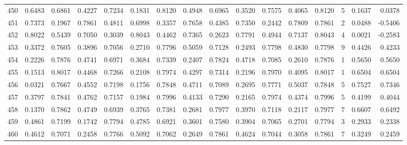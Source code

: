 \begin{tabular}{lrrrrrrrrrrrrrrr}
450 &      0.6483 &  0.6861 &  0.4227 &  0.7234 &  0.1831 &  0.8120 &  0.4948 &  0.6965 &  0.3520 &  0.7575 &   0.4065 &     0.8120 &      5 &                    0.1637 &                     0.0378 \\
451 &      0.7373 &  0.1967 &  0.7861 &  0.4811 &  0.6998 &  0.3357 &  0.7658 &  0.4385 &  0.7350 &  0.2442 &   0.7809 &     0.7861 &      2 &                    0.0488 &                    -0.5406 \\
452 &      0.8022 &  0.5439 &  0.7050 &  0.3039 &  0.8043 &  0.4462 &  0.7365 &  0.2623 &  0.7791 &  0.4944 &   0.7137 &     0.8043 &      4 &                    0.0021 &                    -0.2583 \\
453 &      0.3372 &  0.7605 &  0.3896 &  0.7056 &  0.2710 &  0.7796 &  0.5059 &  0.7128 &  0.2493 &  0.7798 &   0.4830 &     0.7798 &      9 &                    0.4426 &                     0.4233 \\
454 &      0.2226 &  0.7876 &  0.4741 &  0.6971 &  0.3684 &  0.7339 &  0.2407 &  0.7824 &  0.4718 &  0.7085 &   0.2610 &     0.7876 &      1 &                    0.5650 &                     0.5650 \\
455 &      0.1513 &  0.8017 &  0.4468 &  0.7266 &  0.2108 &  0.7974 &  0.4297 &  0.7314 &  0.2196 &  0.7970 &   0.4095 &     0.8017 &      1 &                    0.6504 &                     0.6504 \\
456 &      0.0321 &  0.7667 &  0.4552 &  0.7198 &  0.1756 &  0.7848 &  0.4711 &  0.7089 &  0.2695 &  0.7771 &   0.5037 &     0.7848 &      5 &                    0.7527 &                     0.7346 \\
457 &      0.3797 &  0.7841 &  0.4762 &  0.7157 &  0.1984 &  0.7996 &  0.4133 &  0.7290 &  0.2165 &  0.7974 &   0.4374 &     0.7996 &      5 &                    0.4199 &                     0.4044 \\
458 &      0.1370 &  0.7862 &  0.4749 &  0.6939 &  0.3765 &  0.7381 &  0.2681 &  0.7977 &  0.3970 &  0.7118 &   0.2117 &     0.7977 &      7 &                    0.6607 &                     0.6492 \\
459 &      0.4861 &  0.7199 &  0.1742 &  0.7794 &  0.4785 &  0.6921 &  0.3601 &  0.7580 &  0.3904 &  0.7065 &   0.2701 &     0.7794 &      3 &                    0.2933 &                     0.2338 \\
460 &      0.4612 &  0.7071 &  0.2458 &  0.7766 &  0.5092 &  0.7062 &  0.2649 &  0.7861 &  0.4624 &  0.7044 &   0.3058 &     0.7861 &      7 &                    0.3249 &                     0.2459 \\

\end{tabular}
